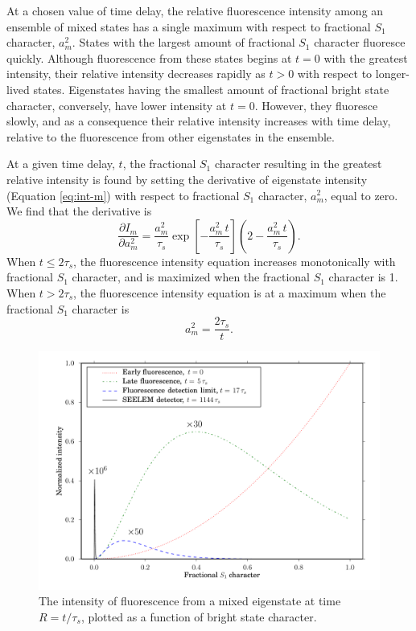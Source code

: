 At a chosen value of time delay, the relative fluorescence intensity
among an ensemble of mixed states has a single maximum with respect to
fractional $S_1$ character, $a_m^2$.  States with the largest amount
of fractional $S_1$ character fluoresce quickly.  Although
fluorescence from these states begins at $t=0$ with the greatest
intensity, their relative intensity decreases rapidly as $t>0$ with
respect to longer-lived states.  Eigenstates having the smallest
amount of fractional bright state character, conversely, have lower
intensity at $t=0$.  However, they fluoresce slowly, and as a
consequence their relative intensity increases with time delay,
relative to the fluorescence from other eigenstates in the ensemble.

At a given time delay, $t$, the fractional $S_1$ character resulting
in the greatest relative intensity is found by setting the derivative
of eigenstate intensity (Equation \ref{eq:int-m}) with respect to
fractional $S_1$ character, $a_m^2$, equal to zero.  We find that the
derivative is
\begin{equation}
 \frac{ \partial I_m }{ \partial a_m^2 } =
   \frac{a_m^2}{\tau_s}
   \exp \left[
     -\frac{a_m^2 \, t}{\tau_s} 
   \right]
   \left (
     2 - \frac{a_m^2 \, t}{\tau_s}
   \right ).
\end{equation}
When $t \leq 2\tau_s$, the fluorescence intensity equation increases
monotonically with fractional $S_1$ character, and is maximized
when the fractional $S_1$ character is 1.  When $t > 2 \tau_s$,
the fluorescence intensity equation is at a maximum when the
fractional $S_1$ character is
\begin{equation}
  \label{eq:am-max}
  a_m^2 = \frac{2 \tau_s}{t}.
\end{equation}

\begin{figure}
  \caption{The intensity of fluorescence from a mixed eigenstate at
    time $R = t/\tau_s$, plotted as a function of bright state
    character.}
  \label{fig:int-at-rc}
  \centering
  \includegraphics[width=7.5in,angle=90]{intensity-at-delay.pdf}
\end{figure}

